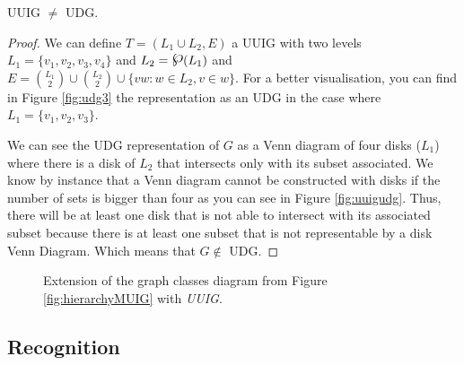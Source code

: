 \begin{theorem}
  \label{theo:uuigudg}
  UUIG $\neq$ UDG.
\end{theorem}

\begin{proof}
  We can define $T = (L_1\cup L_2, E)$ a UUIG with two levels $L_1=\{v_1, v_2, v_3, v_4\}$ and $L_2=\powerset(L_1)$ and $E = \binom{L_1}{2} \cup \binom{L_2}{2} \cup \{vw: w\in L_2, v\in w\}$. For a better visualisation, you can find in Figure \ref{fig:udg3} the representation as an UDG in the case where $L_1 = \{v_1, v_2, v_3\}$.

  We can see the UDG representation of $G$ as a Venn diagram of four disks ($L_1$) where there is a disk of $L_2$ that intersects only with its subset associated. We know by instance that a Venn diagram cannot be constructed with disks if the number of sets is bigger than four \cite{vennDiagrammaticMechanicalRepresentation1880} as you can see in Figure \ref{fig:uuigudg}. Thus, there will be at least one disk that is not able to intersect with its associated subset because there is at least one subset that is not representable by a disk Venn Diagram. Which means that $G \notin$ UDG.
\end{proof}

\begin{figure}
  \begin{center}
\begin{scaletikzpicturetowidth}{\textwidth}
\end{scaletikzpicturetowidth}
\end{center}
\caption{Extension of the graph classes diagram from Figure \ref{fig:hierarchyMUIG} with \emph{UUIG}.}
\label{fig:hierarchyUUIG}
\end{figure}


\subsection{Recognition}

